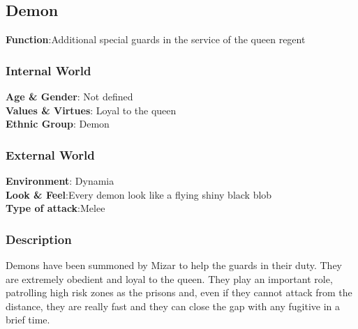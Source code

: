 \subsection{Demon}

\begin{minipage}{0.5\textwidth}
\textbf{Function}:Additional special guards in the service of the queen regent

\subsubsection{Internal World}

\textbf{Age \& Gender}: Not defined \\
\textbf{Values \& Virtues}: Loyal to the queen\\
\textbf{Ethnic Group}: Demon

\subsubsection{External World}
\textbf{Environment}: Dynamia \\
\textbf{Look \& Feel}:Every demon look like a flying shiny black blob\\
\textbf{Type of attack}:Melee \\
\end{minipage}%
%
\hfill\begin{minipage}{0.4\textwidth}
\end{minipage}


\subsubsection{Description}
Demons have been summoned by Mizar to help the guards in their duty. They are extremely obedient and loyal to the queen. They play an important role, patrolling high risk zones as the prisons and, even if they cannot attack from the distance, they are really fast and they can close the gap with any fugitive in a brief time.

